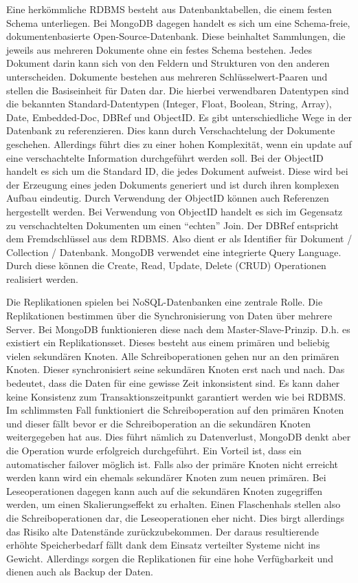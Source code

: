 Eine herkömmliche RDBMS besteht aus Datenbanktabellen, die einem festen
Schema unterliegen. Bei MongoDB dagegen handelt es sich um eine
Schema-freie, dokumentenbasierte Open-Source-Datenbank. Diese beinhaltet
Sammlungen, die jeweils aus mehreren Dokumente ohne ein festes Schema
bestehen. Jedes Dokument darin kann sich von den Feldern und Strukturen
von den anderen unterscheiden. Dokumente bestehen aus mehreren
Schlüsselwert-Paaren und stellen die Basiseinheit für Daten dar. Die
hierbei verwendbaren Datentypen sind die bekannten Standard-Datentypen
(Integer, Float, Boolean, String, Array), Date, Embedded-Doc, DBRef und
ObjectID. Es gibt unterschiedliche Wege in der Datenbank zu
referenzieren. Dies kann durch Verschachtelung der Dokumente geschehen.
Allerdings führt dies zu einer hohen Komplexität, wenn ein update auf
eine verschachtelte Information durchgeführt werden soll. Bei der
ObjectID handelt es sich um die Standard ID, die jedes Dokument
aufweist. Diese wird bei der Erzeugung eines jeden Dokuments generiert
und ist durch ihren komplexen Aufbau eindeutig. Durch Verwendung der
ObjectID können auch Referenzen hergestellt werden. Bei Verwendung von
ObjectID handelt es sich im Gegensatz zu verschachtelten Dokumenten um
einen ``echten'' Join. Der DBRef entspricht dem Fremdschlüssel aus dem
RDBMS. Also dient er als Identifier für Dokument / Collection /
Datenbank. MongoDB verwendet eine integrierte Query Language. Durch
diese können die Create, Read, Update, Delete (CRUD) Operationen
realisiert werden.

Die Replikationen spielen bei NoSQL-Datenbanken eine zentrale Rolle. Die
Replikationen bestimmen über die Synchronisierung von Daten über mehrere
Server. Bei MongoDB funktionieren diese nach dem Master-Slave-Prinzip.
D.h. es existiert ein Replikationsset. Dieses besteht aus einem primären
und beliebig vielen sekundären Knoten. Alle Schreiboperationen gehen nur
an den primären Knoten. Dieser synchronisiert seine sekundären Knoten
erst nach und nach. Das bedeutet, dass die Daten für eine gewisse Zeit
inkonsistent sind. Es kann daher keine Konsistenz zum
Transaktionszeitpunkt garantiert werden wie bei RDBMS. Im schlimmsten
Fall funktioniert die Schreiboperation auf den primären Knoten und
dieser fällt bevor er die Schreiboperation an die sekundären Knoten
weitergegeben hat aus. Dies führt nämlich zu Datenverlust, MongoDB denkt
aber die Operation wurde erfolgreich durchgeführt. Ein Vorteil ist, dass
ein automatischer failover möglich ist. Falls also der primäre Knoten
nicht erreicht werden kann wird ein ehemals sekundärer Knoten zum neuen
primären. Bei Leseoperationen dagegen kann auch auf die sekundären
Knoten zugegriffen werden, um einen Skalierungseffekt zu erhalten. Einen
Flaschenhals stellen also die Schreiboperationen dar, die
Leseoperationen eher nicht. Dies birgt allerdings das Risiko alte
Datenstände zurückzubekommen. Der daraus resultierende erhöhte
Speicherbedarf fällt dank dem Einsatz verteilter Systeme nicht ins
Gewicht. Allerdings sorgen die Replikationen für eine hohe Verfügbarkeit
und dienen auch als Backup der Daten.

